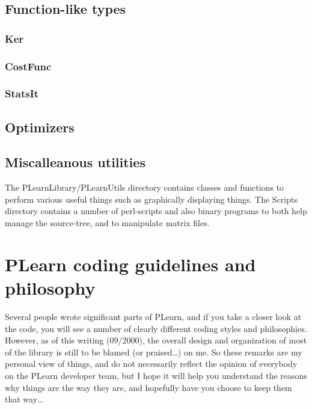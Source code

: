 \documentclass[11pt]{book}
\begin{document}
\section{Function-like types}
\subsection{Ker}
\subsection{CostFunc}
\subsection{StatsIt}
\section{Optimizers}
\label{Optimizer}

% 
% 
\section{ Miscalleanous utilities}

 The PLearnLibrary/PLearnUtils directory contains classes and
functions to perform various useful things such as graphically
displaying things. The Scripts directory contains a number of
perl-scripts and also binary programs to both help manage the
source-tree, and to manipulate matrix files.


\chapter{ PLearn coding guidelines and philosophy}

 Several people wrote significant parts of PLearn, and if you take a
closer look at the code, you will see a number of clearly different
coding styles and philosophies. However, as of this writing (09/2000),
the overall design and organization of most of the library is still to
be blamed (or praised\ldots) on me. So these remarks are my personal
view of things, and do not necessarily reflect the opinion of everybody
on the PLearn developer team, but I hope it will help you understand
the reasons why things are the way they are, and hopefully have you
choose to keep them that way\ldots
\end{document}
